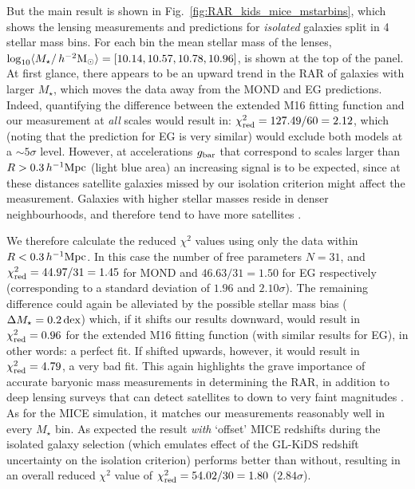 \documentclass[usenatbib]{mnras}
\newcommand{\hmsun}{\,h^{-2} {\rm M_\odot}}
\newcommand{\hMpc}{\, h^{-1}{\rm{Mpc}} }
\newcommand{\lan}{\langle}
\newcommand{\ran}{\rangle}
\newcommand{\un}[1]{_{\rm #1}}
\newcommand{\dex}{\, {\rm dex}}
\begin{document}
But the main result is shown in Fig.~\ref{fig:RAR_kids_mice_mstarbins}, which shows the lensing measurements and predictions for \emph{isolated} galaxies split in 4 stellar mass bins. For each bin the mean stellar mass of the lenses, $\log_{10}\lan M_\star/\hmsun \ran = [10.14, 10.57, 10.78, 10.96]$, is shown at the top of the panel. At first glance, there appears to be an upward trend in the RAR of galaxies with larger $M_\star$, which moves the data away from the MOND and EG predictions. Indeed, quantifying the difference between the extended M16 fitting function and our measurement at \emph{all} scales would result in: $\chi\un{red}^2 = 127.49 / 60 = 2.12$, which (noting that the prediction for EG is very similar) would exclude both models at a $\sim5 \sigma$ level. However, at accelerations $g\un{bar}$ that correspond to scales larger than $R > 0.3 \hMpc$ (light blue area) an increasing signal is to be expected, since at these distances satellite galaxies missed by our isolation criterion might affect the measurement. Galaxies with higher stellar masses reside in denser neighbourhoods, and therefore tend to have more satellites \cite[see e.g.][]{baldry2006, bolzonella2010, brouwer2016}.

We therefore calculate the reduced $\chi^2$ values using only the data within $R < 0.3 \hMpc$. In this case the number of free parameters $N = 31$, and $\chi\un{red}^2 = 44.97 / 31 = 1.45$ for MOND and $46.63 / 31 = 1.50$ for EG respectively (corresponding to a standard deviation of $1.96$ and $2.10\sigma$). The remaining difference could again be alleviated by the possible stellar mass bias ($\Delta M_\star = 0.2 \dex$) which, if it shifts our results downward, would result in $\chi\un{red}^2 = 0.96$ for the extended M16 fitting function (with similar results for EG), in other words: a perfect fit. If shifted upwards, however, it would result in $\chi\un{red}^2=4.79$, a very bad fit. This again highlights the grave importance of accurate baryonic mass measurements in determining the RAR, in addition to deep lensing surveys that can detect satellites to down to very faint magnitudes \cite[such as the future Euclid survey;][]{laureijs2011}. As for the MICE simulation, it matches our measurements reasonably well in every $M_\star$ bin. As expected the result \emph{with} `offset' MICE redshifts during the isolated galaxy selection (which emulates effect of the GL-KiDS redshift uncertainty on the isolation criterion) performs better than without, resulting in an overall reduced $\chi^2$ value of $\chi\un{red}^2 = 54.02 / 30 = 1.80$ ($2.84 \sigma$).
\end{document}
